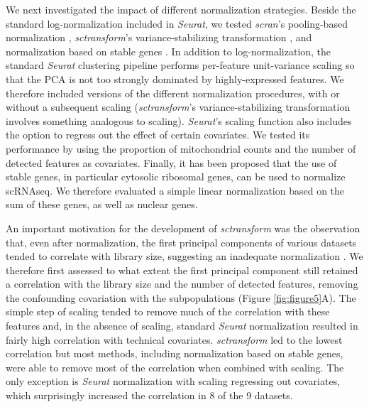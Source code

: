 \documentclass{bmcart}
\begin{document}
We next investigated the impact of different normalization strategies. Beside the standard log-normalization included in \textit{Seurat}, we tested \textit{scran}'s pooling-based normalization \citep{lunPooling2016}, \textit{sctransform}'s variance-stabilizing transformation \citep{hafemeisterSCtransform2019}, and normalization based on stable genes \citep{linStableGenes2018, deekeStablyExpressed2018}. 
In addition to log-normalization, the standard \textit{Seurat} clustering pipeline performs per-feature unit-variance scaling so that the PCA is not too strongly dominated by highly-expressed features. We therefore included versions of the different normalization procedures, with or without a subsequent scaling (\textit{sctransform}'s variance-stabilizing transformation involves something analogous to scaling). 
\textit{Seurat}'s scaling function also includes the option to regress out the effect of certain covariates. We tested its performance by using the proportion of mitochondrial counts and the number of detected features as covariates. Finally, it has been proposed that the use of stable genes, in particular cytosolic ribosomal genes, can be used to normalize scRNAseq\citep{deekeStablyExpressed2018}. We therefore evaluated a simple linear normalization based on the sum of these genes, as well as nuclear genes.

An important motivation for the development of \textit{sctransform} was the observation that, even after normalization, the first principal components of various datasets tended to correlate with library size, suggesting an inadequate normalization \citep{hafemeisterSCtransform2019}. We therefore first assessed to what extent the first principal component still retained a correlation with the library size and the number of detected features, removing the confounding covariation with the subpopulations (Figure \ref{fig:figure5}A). The simple step of scaling tended to remove much of the correlation with these features and, in the absence of scaling, standard \textit{Seurat} normalization resulted in fairly high correlation with technical covariates. \textit{sctransform} led to the lowest correlation but most methods, including normalization based on stable genes, were able to remove most of the correlation when combined with scaling. The only exception is \textit{Seurat} normalization with scaling regressing out covariates, which surprisingly increased the correlation in 8 of the 9 datasets.
\end{document}
